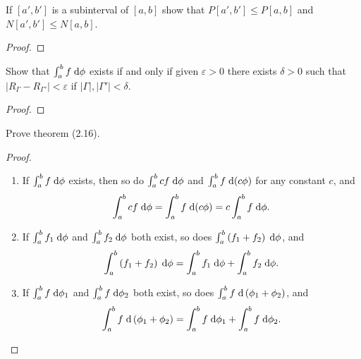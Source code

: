 \begin{problem}
If $[a',b']$ is a subinterval of $[a,b]$ show that $P[a',b']\leq P[a,b]$
and $N[a',b']\leq N[a,b]$.
\end{problem}
\begin{proof}
\end{proof}
\newpage

\begin{problem}
Show that $\int_a^bf\;\mathrm{d}\phi$ exists if and only if given $\varepsilon>0$
there exists $\delta>0$ such that
$\left|R_\Gamma-R_{\Gamma'}\right|<\varepsilon$ if
$|\Gamma|,|\Gamma'|<\delta$.
\end{problem}
\begin{proof}
\end{proof}
\newpage

\begin{problem}
Prove theorem (2.16).
\end{problem}
\begin{proof}
\begin{theorem*}
\begin{enumerate}[label=(\roman*)]
\item If $\int_a^b f\;\mathrm{d}\phi$ exists, then so do $\int_a^bcf\;\mathrm{d}\phi$ and
  $\int_a^b f\;\mathrm{d}(c\phi)$ for any constant $c$, and
\[
\int_a^bcf\;\mathrm{d}\phi=\int_a^bf\;\mathrm{d}(c\phi)=c\int_a^bf\;\mathrm{d}\phi.
\]
\item If $\int_a^b f_1\;\mathrm{d}\phi$ and $\int_a^bf_2\;\mathrm{d}\phi$ both exist, so
  does $\int_a^b\left(f_1+f_2\right)\;\mathrm{d}\phi$, and
\[
\int_a^b\left(f_1+f_2\right)\;\mathrm{d}\phi=\int_a^bf_1\;\mathrm{d}\phi+\int_a^bf_2\;\mathrm{d}\phi.
\]
\item If $\int_a^bf\;\mathrm{d}\phi_1$ and $\int_a^bf\;\mathrm{d}\phi_2$ both exist, so
  does $\int_a^bf\;\mathrm{d}\left(\phi_1+\phi_2\right)$, and
\[
\int_a^bf\;\mathrm{d}\left(\phi_1+\phi_2\right)=\int_a^bf\;\mathrm{d}\phi_1+\int_a^bf\;\mathrm{d}\phi_2.
\]
\end{enumerate}
\end{theorem*}
\end{proof}
\newpage

